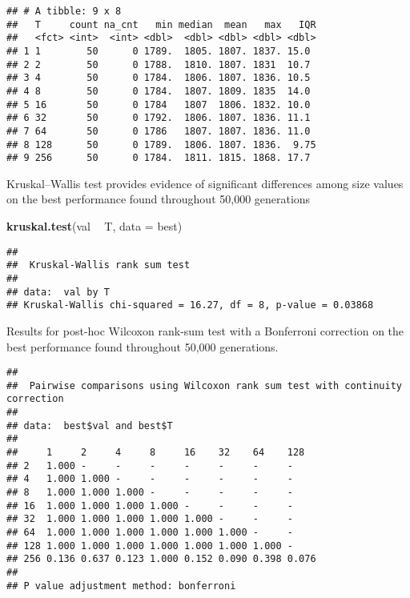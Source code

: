\documentclass[]{book}
\newenvironment{Shaded}{\begin{snugshade}}{\end{snugshade}}
\newcommand{\DataTypeTok}[1]{\textcolor[rgb]{0.13,0.29,0.53}{#1}}
\newcommand{\KeywordTok}[1]{\textcolor[rgb]{0.13,0.29,0.53}{\textbf{#1}}}
\newcommand{\NormalTok}[1]{#1}
\newcommand{\OperatorTok}[1]{\textcolor[rgb]{0.81,0.36,0.00}{\textbf{#1}}}
\newcommand{\OtherTok}[1]{\textcolor[rgb]{0.56,0.35,0.01}{#1}}
\newcommand{\StringTok}[1]{\textcolor[rgb]{0.31,0.60,0.02}{#1}}
\begin{document}
\begin{verbatim}
## # A tibble: 9 x 8
##   T     count na_cnt   min median  mean   max   IQR
##   <fct> <int>  <int> <dbl>  <dbl> <dbl> <dbl> <dbl>
## 1 1        50      0 1789.  1805. 1807. 1837. 15.0 
## 2 2        50      0 1788.  1810. 1807. 1831  10.7 
## 3 4        50      0 1784.  1806. 1807. 1836. 10.5 
## 4 8        50      0 1784.  1807. 1809. 1835  14.0 
## 5 16       50      0 1784   1807  1806. 1832. 10.0 
## 6 32       50      0 1792.  1806. 1807. 1836. 11.1 
## 7 64       50      0 1786   1807. 1807. 1836. 11.0 
## 8 128      50      0 1789.  1806. 1807. 1836.  9.75
## 9 256      50      0 1784.  1811. 1815. 1868. 17.7
\end{verbatim}

Kruskal--Wallis test provides evidence of significant differences among size values on the best performance found throughout 50,000 generations

\begin{Shaded}
\begin{Highlighting}[]
\KeywordTok{kruskal.test}\NormalTok{(val }\OperatorTok{~}\StringTok{ }\NormalTok{T, }\DataTypeTok{data =}\NormalTok{ best)}
\end{Highlighting}
\end{Shaded}

\begin{verbatim}
## 
##  Kruskal-Wallis rank sum test
## 
## data:  val by T
## Kruskal-Wallis chi-squared = 16.27, df = 8, p-value = 0.03868
\end{verbatim}

Results for post-hoc Wilcoxon rank-sum test with a Bonferroni correction on the best performance found throughout 50,000 generations.

\begin{Shaded}
\end{Shaded}

\begin{verbatim}
## 
##  Pairwise comparisons using Wilcoxon rank sum test with continuity correction 
## 
## data:  best$val and best$T 
## 
##     1     2     4     8     16    32    64    128  
## 2   1.000 -     -     -     -     -     -     -    
## 4   1.000 1.000 -     -     -     -     -     -    
## 8   1.000 1.000 1.000 -     -     -     -     -    
## 16  1.000 1.000 1.000 1.000 -     -     -     -    
## 32  1.000 1.000 1.000 1.000 1.000 -     -     -    
## 64  1.000 1.000 1.000 1.000 1.000 1.000 -     -    
## 128 1.000 1.000 1.000 1.000 1.000 1.000 1.000 -    
## 256 0.136 0.637 0.123 1.000 0.152 0.090 0.398 0.076
## 
## P value adjustment method: bonferroni
\end{verbatim}
\end{document}
